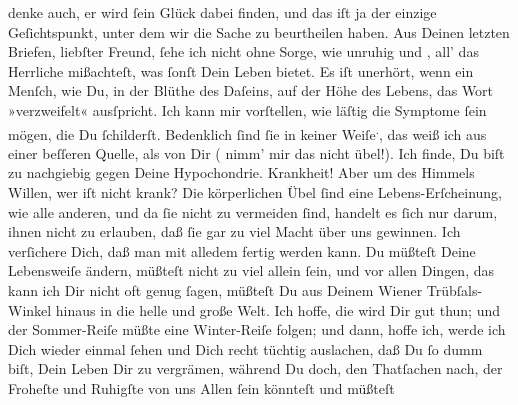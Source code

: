 \begin{ledgroupsized}[t]{13cm}
               denke auch, er wird ſein Glück  dabei finden, und das iſt ja der einzige Geſichtspunkt, unter dem wir die
               Sache zu beurtheilen haben.\pend
           \pstart
           Aus Deinen letzten Briefen, liebſter Freund, ſehe ich nicht ohne Sorge, wie {\pb}unruhig und \label{K_L02848-2v}\label{K_L02848-2h}, all’ das Herrliche mißachteſt, was ſonſt Dein
               Leben bietet. Es iſt unerhört, wenn ein Menſch, wie Du, in der Blüthe des Daſeins,
               auf der Höhe des Lebens, das Wort »verzweifelt« ausſpricht. Ich kann mir vorſtellen,
               wie läſtig die Symptome ſein mögen, die Du ſchilderſt. Bedenklich ſind ſie in keiner Weiſe\substVorne{}\textsuperscript{.}\substDazwischen{},\substHinten{} das weiß ich aus einer beſſeren Quelle, als von Dir {\pb}( nimm’ mir das
               nicht übel!). Ich finde, Du biſt zu nachgiebig gegen Deine Hypochondrie. Krankheit!
               Aber um des Himmels Willen, wer iſt nicht krank? Die körperlichen Übel ſind eine
               Lebens-Erſcheinung, wie alle anderen, und da ſie nicht zu vermeiden ſind, handelt es
               ſich nur darum, ihnen nicht zu erlauben, daß ſie gar zu viel Macht  über uns gewinnen. Ich verſichere Dich, daß man mit
               alledem fertig werden kann. Du müßteſt {\pb}Deine
               Lebensweiſe ändern, müßteſt nicht zu viel allein ſein, und vor allen Dingen, das kann
               ich Dir nicht oft genug ſagen, müßteſt Du aus Deinem Wiener Trübſals-Winkel hinaus in die helle und große Welt. Ich hoffe, die
                  \label{K_L02848-3v}\label{K_L02848-3h} wird Dir gut thun; und der Sommer-Reiſe müßte eine Winter-Reiſe folgen; und
               dann, hoffe ich, werde ich Dich wieder einmal ſehen {\pb}und Dich recht tüchtig auslachen, daß Du ſo  dumm
               biſt, Dein Leben Dir zu vergrämen, während Du doch, den Thatſachen nach, der Froheſte
               und Ruhigſte von uns Allen ſein könnteſt und müßteſt{\dotsseven}\pend

\end{ledgroupsized}
